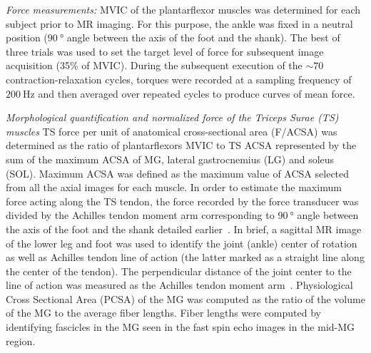 \textit{Force measurements:}
MVIC of the plantarflexor muscles was determined for each subject prior to MR imaging.
For this purpose, the ankle was fixed in a neutral position ($\SI{90}{\degree}$ angle between the axis of the foot and the shank). 
The best of three trials was used to set the target level of force for subsequent image acquisition (35\% of MVIC). 
During the subsequent execution of the $\sim70$ contraction-relaxation cycles, torques were recorded at a sampling frequency of $\SI{200}{\hertz}$ and then averaged over repeated cycles to produce curves of mean force.

\textit{Morphological quantification and normalized force of the Triceps Surae (TS) muscles}
TS force per unit of anatomical cross-sectional area (F/ACSA) was determined as the ratio of plantarflexors MVIC to TS ACSA represented by the sum of the maximum ACSA of MG, lateral gastrocnemius (LG) and soleus (SOL). 
Maximum ACSA was defined as the maximum value of ACSA selected from all the axial images for each muscle. 
In order to estimate the maximum force acting along the TS tendon, the force recorded by the force transducer was divided by the Achilles tendon moment arm corresponding to $\SI{90}{\degree}$ angle between the axis of the foot and the shank detailed earlier~\cite{RNS20}. 
In brief, a sagittal MR image of the lower leg and foot was used to identify the joint (ankle) center of rotation as well as Achilles tendon line of action (the latter marked as a straight line along the center of the tendon). 
The perpendicular distance of the joint center to the line of action was measured as the Achilles tendon moment arm~\cite{RNS21}. 
Physiological Cross Sectional Area (PCSA) of the MG was computed as the ratio of the volume of the MG to the average fiber lengths. 
Fiber lengths were computed by identifying fascicles in the MG seen in the fast spin echo images in the mid-MG region.
